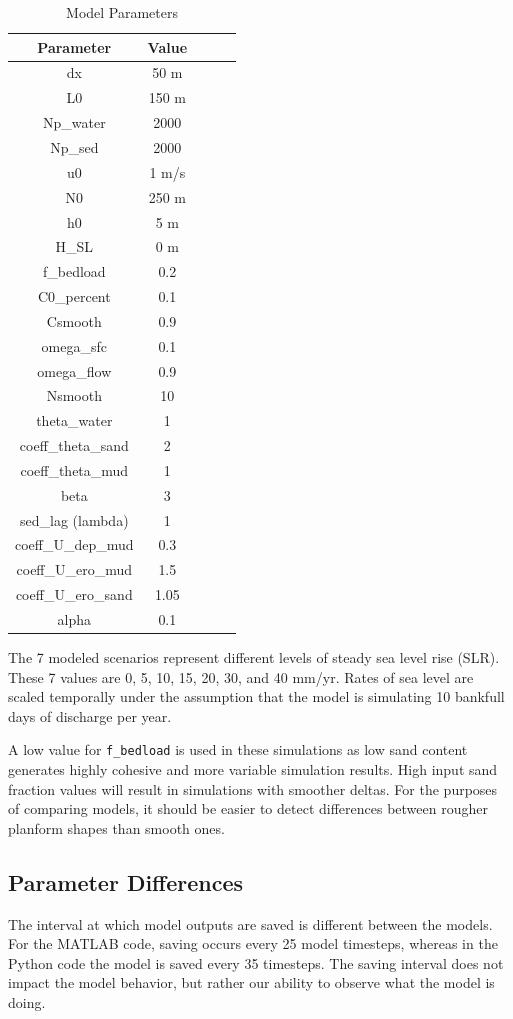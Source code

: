 \documentclass[a4paper]{article}
\begin{document}
\begin{table}[!ht]
\begin{center}
\begin{tabular}{| c | c | c | c | c |}
\hline
Parameter & Value \\
\hline
dx & 50 m \\
L0 & 150 m \\
Np\_water & 2000 \\
Np\_sed & 2000 \\
u0 & 1 m/s \\
N0 & 250 m \\
h0 & 5 m \\
H\_SL & 0 m \\
f\_bedload & 0.2 \\
C0\_percent & 0.1 \\
Csmooth & 0.9 \\
omega\_sfc & 0.1 \\
omega\_flow & 0.9 \\
Nsmooth & 10 \\
theta\_water & 1 \\
coeff\_theta\_sand & 2 \\
coeff\_theta\_mud & 1 \\
beta & 3 \\
sed\_lag (lambda) & 1 \\
coeff\_U\_dep\_mud & 0.3 \\
coeff\_U\_ero\_mud & 1.5 \\
coeff\_U\_ero\_sand & 1.05 \\
alpha & 0.1 \\
\hline
\end{tabular}
\caption{Model Parameters}
\label{tab:params}
\end{center}
\end{table}

The 7 modeled scenarios represent different levels of steady sea level rise (SLR).
These 7 values are 0, 5, 10, 15, 20, 30, and 40 mm/yr.
Rates of sea level are scaled temporally under the assumption that the model is simulating 10 bankfull days of discharge per year.

A low value for \texttt{f\_bedload} is used in these simulations as low sand content generates highly cohesive and more variable simulation results.
High input sand fraction values will result in simulations with smoother deltas.
For the purposes of comparing models, it should be easier to detect differences between rougher planform shapes than smooth ones.


\subsection{Parameter Differences}
The interval at which model outputs are saved is different between the models. For the MATLAB code, saving occurs every 25 model timesteps, whereas in the Python code the model is saved every 35 timesteps.
The saving interval does not impact the model behavior, but rather our ability to observe what the model is doing.
\end{document}
